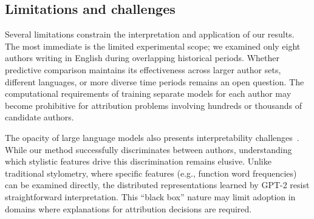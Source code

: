 \documentclass[11pt]{article}
\begin{document}
\subsection{Limitations and challenges}

Several limitations constrain the interpretation and application of our results.
The most immediate is the limited experimental scope; we examined only eight
authors writing in English during overlapping historical periods. Whether
predictive comparison maintains its effectiveness across larger author sets,
different languages, or more diverse time periods remains an open question.
The computational requirements of training separate models for each author may
become prohibitive for attribution problems involving hundreds or thousands of
candidate authors.

The opacity of large language models also presents interpretability
challenges~\citep{SchuEtal20}. While our method successfully discriminates
between authors, understanding which stylistic features drive this
discrimination remains elusive. Unlike traditional stylometry, where specific
features (e.g., function word frequencies) can be examined directly, the
distributed representations learned by GPT-2 resist straightforward
interpretation. This ``black box'' nature may limit adoption in domains where
explanations for attribution decisions are required.
\end{document}
